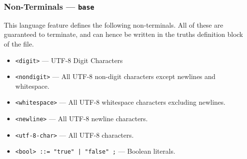 
\subsubsection{Non-Terminals --- \texttt{base}} %
\label{ssub:non_terminals_base}
This language feature defines the following non-terminals. 
All of these are guaranteed to terminate, and can hence be written in the truths definition block of the file. 
\begin{itemize}
    \item \texttt{<digit>} --- UTF-8 Digit Characters
    \item \texttt{<nondigit>} --- All UTF-8 non-digit characters except newlines and whitespace.
    \item \texttt{<whitespace>} --- All UTF-8 whitespace characters excluding newlines.
    \item \texttt{<newline>} --- All UTF-8 newline characters.
    \item \texttt{<utf-8-char>} --- All UTF-8 characters.
    \item \texttt{<bool> ::= "true" | "false" ;} --- Boolean literals.
\end{itemize}


